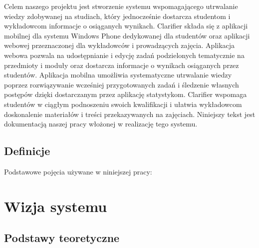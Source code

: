 \documentclass{pracamgr}
\begin{document}
Celem naszego projektu jest stworzenie systemu wspomagającego utrwalanie wiedzy zdobywanej na studiach, który jednocześnie dostarcza studentom i wykładowcom informacje o osiąganych wynikach. Clarifier składa się z aplikacji mobilnej dla systemu Windows Phone dedykowanej dla studentów oraz aplikacji webowej przeznaczonej dla wykładowców i prowadzących zajęcia. Aplikacja webowa pozwala na udostępnianie i edycję zadań podzielonych tematycznie na przedmioty i moduły oraz dostarcza informacje o wynikach osiąganych przez studentów. Aplikacja mobilna umożliwia systematyczne utrwalanie wiedzy poprzez rozwiązywanie wcześniej przygotowanych zadań i śledzenie własnych postępów dzięki dostarczanym przez aplikację statystykom. Clarifier wspomaga studentów w ciągłym podnoszeniu swoich kwalifikacji i ułatwia wykładowcom doskonalenie materiałów i treści przekazywanych na zajęciach.  
Niniejszy tekst jest dokumentacją naszej pracy włożonej w realizację tego systemu.

\section{Definicje}

Podstawowe pojęcia używane w niniejszej pracy:

\chapter{Wizja systemu}\label{r:vision}

\section{Podstawy teoretyczne}
\end{document}
